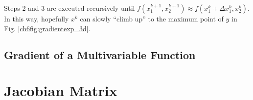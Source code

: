 Steps 2 and 3 are executed recursively until $f(x_1^{k+1}, x_2^{k+1}) \approx f(x_1^k+\Delta x_1^k, x_2^k)$. In this way, hopefully $x^k$ can slowly ``climb up'' to the maximum point of $y$ in Fig. \ref{ch6fig:gradientexp_3d}.























\subsection{Gradient of a Multivariable Function} \label{ch6subsec:gradientdef}




\section{Jacobian Matrix} \label{ch6sec:jacobianmatrix}

